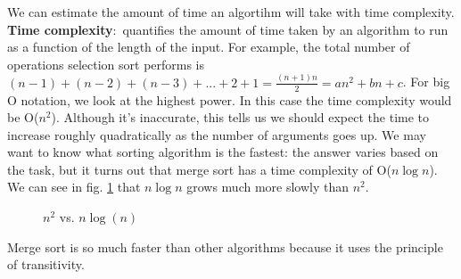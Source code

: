 \documentclass[nobib]{tufte-handout}
\newcommand{\defn}[2]{\noindent\textbf{#1}:\ #2}
\begin{document}
We can estimate the amount of time an algortihm will take 
with time complexity. 
\defn{Time complexity}{quantifies the amount of time taken 
by an algorithm to run as a function of the length of the input}.
For example, the total number of operations selection sort 
performs is $(n-1) + (n-2) + (n-3) + ... + 2 + 1 = \frac{(n+1)n}{2} = 
an^2+bn+c$. For big O notation, we look at the highest power. In this 
case the time complexity would be O($n^2$). Although it's inaccurate, 
this tells us we should expect the time to increase roughly quadratically 
as the number of arguments goes up. We may want to know what sorting algorithm 
is the fastest: the answer varies based on the task, but it turns out 
that merge sort has a time complexity of O($n \log{n}$). We can see in fig. 
\ref{fig:tc} that $n \log{n}$ grows much more slowly than $n^2$. 
\begin{figure}
   \caption{$n^2$ vs. $n\log(n)$}
   \label{fig:tc}
\end{figure}
Merge sort is so much faster than other algorithms because it uses the principle of 
transitivity. 
\end{document}
